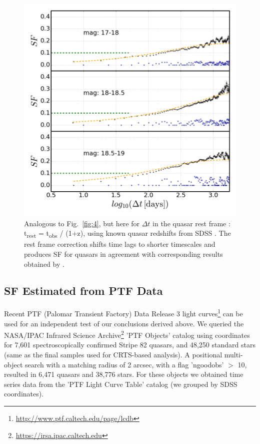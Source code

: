 \documentclass[fleqn,usenatbib]{mnras}  %
\begin{document}
\begin{figure}

\vskip -0.15in
\includegraphics[width=1.1\columnwidth, center]{Fig_5_SF_QSO_starsB_r_cut_rest.png}
\caption{Analogous to Fig.~\ref{fig:4}, but here for $\Delta t$ in the quasar rest frame : t\textsubscript{rest} = t\textsubscript{obs} / (1+z), using known quasar redshifts from SDSS \citep{macleod2010}.  The rest frame correction shifts time lags to shorter timescales and produces
SF for quasars in agreement with corresponding results obtained by \citep{macleod2010}.}
\label{fig:5}
\end{figure}




\subsection{SF Estimated from PTF Data}

Recent PTF (Palomar Transient Factory) Data Release 3 light curves\footnote{\url{http://www.ptf.caltech.edu/page/lcdb}}
can be used for an independent test of our conclusions derived above. We queried the NASA/IPAC Infrared Science 
Archive\footnote{\url{https://irsa.ipac.caltech.edu}} 'PTF Objects' catalog using coordinates for 7,601 spectroscopically
confirmed Stripe 82 quasars, and 48,250 standard stars (same as the final samples used for CRTS-based analysis).
A positional multi-object search with a matching radius of 2 arcsec, with a flag 'ngoodobs' $>$ 10,  resulted in  
6,471 quasars and 38,776 stars.  For these objects we obtained time series data from the 'PTF Light Curve Table' catalog
(we grouped by SDSS coordinates). 
\end{document}
